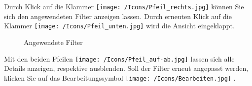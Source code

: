 Durch Klick auf die Klammer \texttt{[image: /Icons/Pfeil\_rechts.jpg]}  können Sie sich den angewendeten Filter anzeigen lassen. Durch erneuten Klick auf die Klammer \texttt{[image: /Icons/Pfeil\_unten.jpg]}  wird die Ansicht eingeklappt.

\begin{figure}[H]
\caption{Angewendete Filter}
\end{figure}

Mit den beiden Pfeilen \texttt{[image: /Icons/Pfeil\_auf-ab.jpg]}  lassen sich alle Details anzeigen, respektive ausblenden. Soll der Filter erneut angepasst werden, klicken Sie auf das Bearbeitungssymbol \texttt{[image: /Icons/Bearbeiten.jpg]} .
